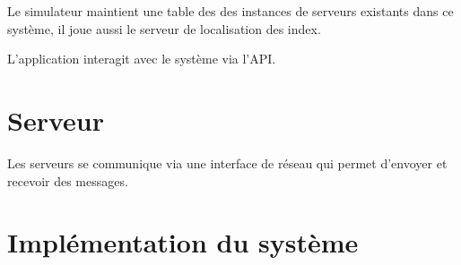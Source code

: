 \documentclass[a4paper,11pt]{report}
\begin{document}
	Le simulateur maintient une table des des instances de serveurs existants dans ce système, il joue aussi le serveur de localisation des index.
	
	L'application interagit avec le système via l'API.
	
\section{Serveur}
	Les serveurs se communique via une interface de réseau qui permet d'envoyer et recevoir des messages.
	
\section{Implémentation du système}
	
\end{document}
